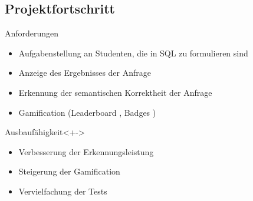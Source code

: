 \subsection{Projektfortschritt}

\begin{frame}{\insertsectionhead}{\insertsubsectionhead}
  \begin{block}{Anforderungen}
    \begin{itemize}
      \item Aufgabenstellung an Studenten, die in SQL zu formulieren sind \only<+->{\done}
      \item Anzeige des Ergebnisses der Anfrage \only<+->{\done}
      \item Erkennung der semantischen Korrektheit der Anfrage \only<+->{\done}
      \item Gamification (Leaderboard \only<+->{\done}, Badges ) 
    \end{itemize}
  \end{block}

  \begin{block}{Ausbaufähigkeit}<+->
    \begin{itemize}
      \item Verbesserung der Erkennungsleistung
      \item Steigerung der Gamification
      \item Vervielfachung der Tests
    \end{itemize}
  \end{block}
\end{frame}

